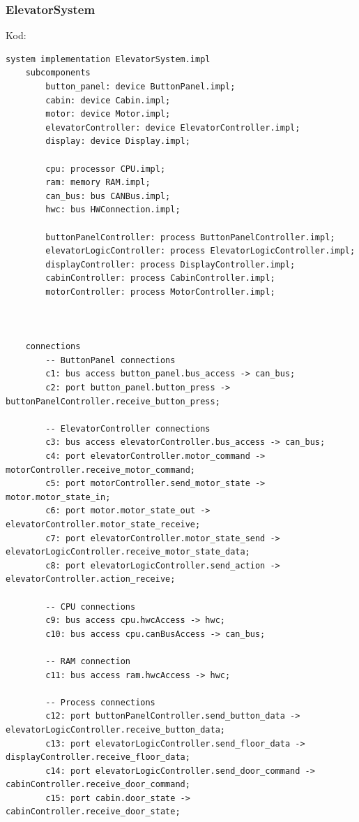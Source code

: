 \documentclass{article}
\begin{document}
    
    \subsubsection{ElevatorSystem}

    Kod:
    
    \begin{lstlisting}[basicstyle=\ttfamily, keywordstyle=\bfseries]
system implementation ElevatorSystem.impl
    subcomponents
        button_panel: device ButtonPanel.impl;
        cabin: device Cabin.impl;
        motor: device Motor.impl;
        elevatorController: device ElevatorController.impl;
        display: device Display.impl;

        cpu: processor CPU.impl;
        ram: memory RAM.impl;
        can_bus: bus CANBus.impl;
        hwc: bus HWConnection.impl;

        buttonPanelController: process ButtonPanelController.impl;
        elevatorLogicController: process ElevatorLogicController.impl;
        displayController: process DisplayController.impl;
        cabinController: process CabinController.impl;
        motorController: process MotorController.impl;
    
    

    connections
        -- ButtonPanel connections
        c1: bus access button_panel.bus_access -> can_bus;
        c2: port button_panel.button_press -> buttonPanelController.receive_button_press;
    
        -- ElevatorController connections
        c3: bus access elevatorController.bus_access -> can_bus;
        c4: port elevatorController.motor_command -> motorController.receive_motor_command;
        c5: port motorController.send_motor_state -> motor.motor_state_in;
        c6: port motor.motor_state_out -> elevatorController.motor_state_receive;
        c7: port elevatorController.motor_state_send -> elevatorLogicController.receive_motor_state_data;
        c8: port elevatorLogicController.send_action -> elevatorController.action_receive;  
    
        -- CPU connections
        c9: bus access cpu.hwcAccess -> hwc;
        c10: bus access cpu.canBusAccess -> can_bus;
    
        -- RAM connection
        c11: bus access ram.hwcAccess -> hwc;
    
        -- Process connections
        c12: port buttonPanelController.send_button_data -> elevatorLogicController.receive_button_data;
        c13: port elevatorLogicController.send_floor_data -> displayController.receive_floor_data;
        c14: port elevatorLogicController.send_door_command -> cabinController.receive_door_command;
        c15: port cabin.door_state -> cabinController.receive_door_state;
    

\end{lstlisting}
\end{document}
